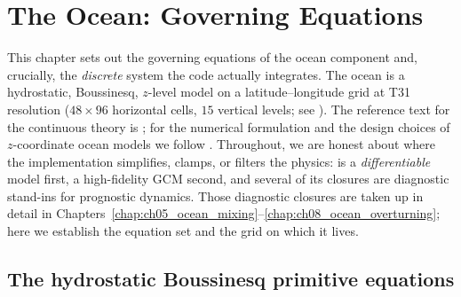 \chapter{The Ocean: Governing Equations}\label{chap:ch04_ocean_equations}

\providecommand{\alphaT}{\alpha_T}   %
\providecommand{\betaS}{\beta_S}     %
\providecommand{\maskC}{\chi}        %

This chapter sets out the governing equations of the \model{} ocean
component and, crucially, the \emph{discrete} system the code actually
integrates. The ocean is a hydrostatic, Boussinesq, $z$-level model on a
latitude--longitude grid at T31 resolution ($48\times96$ horizontal cells,
$15$ vertical levels; see ). The reference text for the
continuous theory is \citet{vallis2017}; for the numerical formulation and
the design choices of $z$-coordinate ocean models we follow
\citet{griffies2004}. Throughout, we are honest about where the
implementation simplifies, clamps, or filters the physics: \model{} is a
\emph{differentiable} model first, a high-fidelity GCM second, and several
of its closures are diagnostic stand-ins for prognostic dynamics. Those
diagnostic closures are taken up in detail in
Chapters~\ref{chap:ch05_ocean_mixing}--\ref{chap:ch08_ocean_overturning};
here we establish the equation set and the grid on which it lives.

\section{The hydrostatic Boussinesq primitive equations}

